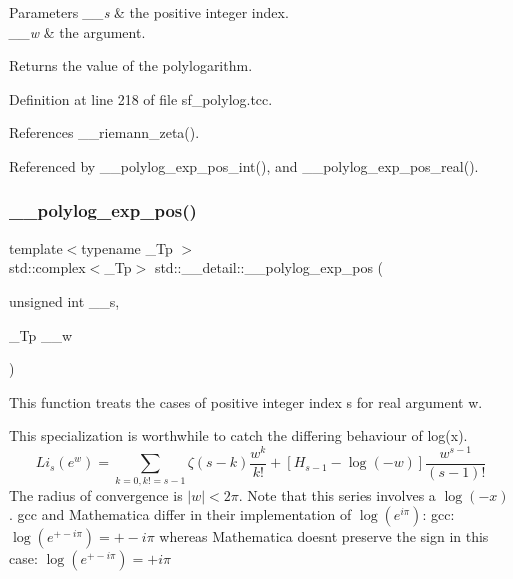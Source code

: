 \begin{DoxyParams}{Parameters}
{\em \+\_\+\+\_\+s} & the positive integer index. \\
\hline
{\em \+\_\+\+\_\+w} & the argument. \\
\hline
\end{DoxyParams}
\begin{DoxyReturn}{Returns}
the value of the polylogarithm. 
\end{DoxyReturn}


Definition at line 218 of file sf\+\_\+polylog.\+tcc.



References \+\_\+\+\_\+riemann\+\_\+zeta().



Referenced by \+\_\+\+\_\+polylog\+\_\+exp\+\_\+pos\+\_\+int(), and \+\_\+\+\_\+polylog\+\_\+exp\+\_\+pos\+\_\+real().

\mbox{\label{namespacestd_1_1____detail_ab13a4be6685dd222b654da3297342d7e}} 
\subsubsection{\texorpdfstring{\+\_\+\+\_\+polylog\+\_\+exp\+\_\+pos()}{\_\_polylog\_exp\_pos()}\hspace{0.1cm}{\footnotesize\ttfamily [2/3]}}
{\footnotesize\ttfamily template$<$typename \+\_\+\+Tp $>$ \\
std\+::complex$<$\+\_\+\+Tp$>$ std\+::\+\_\+\+\_\+detail\+::\+\_\+\+\_\+polylog\+\_\+exp\+\_\+pos (\begin{DoxyParamCaption}\item[{unsigned int}]{\+\_\+\+\_\+s,  }\item[{\+\_\+\+Tp}]{\+\_\+\+\_\+w }\end{DoxyParamCaption})}

This function treats the cases of positive integer index s for real argument w.

This specialization is worthwhile to catch the differing behaviour of log(x). \[ Li_s(e^w) = \sum_{k=0, k != s-1} \zeta(s-k) \frac{w^k}{k!} + \left[H_{s-1} - \log(-w)\right] \frac{w^{s-1}}{(s-1)!} \] The radius of convergence is $ |w| < 2 \pi $. Note that this series involves a $ \log(-x) $. gcc and Mathematica differ in their implementation of $ \log(e^{i\pi}) $\+: gcc\+: $ \log(e^{+-i\pi}) = +-i\pi $ whereas Mathematica doesn\textquotesingle{}t preserve the sign in this case\+: $ \log(e^{+- i\pi}) = +i\pi $


